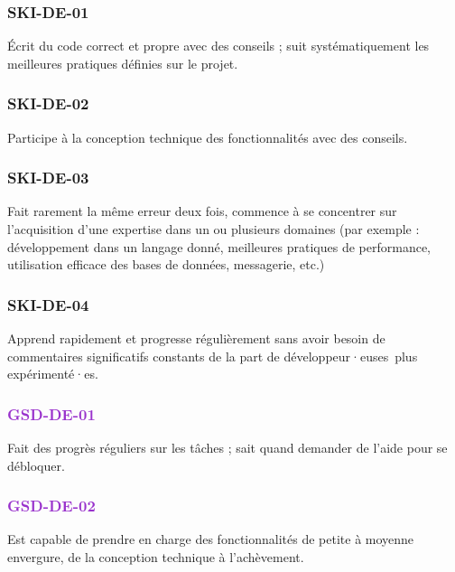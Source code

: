 \documentclass[a4paper, french, openany, 12pt]{book}
\newcommand\dex[1]{\textcolor{BrickRed}{\textbf{\uppercase{ski-{#1}}}}}
\newcommand\str[1]{\textcolor{DarkOrchid}{\textbf{\uppercase{gsd-{#1}}}}}
\newcommand\devs{développeur·euses}
\begin{document}
\begin{multicols}{2}

  \subsubsection*{\dex{de-01}}

  Écrit du code correct et propre avec des conseils ; suit systématiquement les meilleures pratiques définies sur le
  projet.

  \subsubsection*{\dex{de-02}}

  Participe à la conception technique des fonctionnalités avec des conseils.

  \subsubsection*{\dex{de-03}}

  Fait rarement la même erreur deux fois, commence à se concentrer sur l'acquisition d'une expertise dans un ou plusieurs 
  domaines (par exemple : développement dans un langage donné, meilleures pratiques de performance, utilisation efficace 
  des bases de données, messagerie, etc.)

  \subsubsection*{\dex{de-04}}

  Apprend rapidement et progresse régulièrement sans avoir besoin de commentaires significatifs constants de la part 
  de \devs\ plus expérimenté·es.

  \subsubsection*{\str{de-01}}

  Fait des progrès réguliers sur les tâches ; sait quand demander de l'aide pour se débloquer.

  \subsubsection*{\str{de-02}}

  Est capable de prendre en charge des fonctionnalités de petite à moyenne envergure, de la conception technique à 
  l'achèvement.


\end{multicols}
\end{document}
